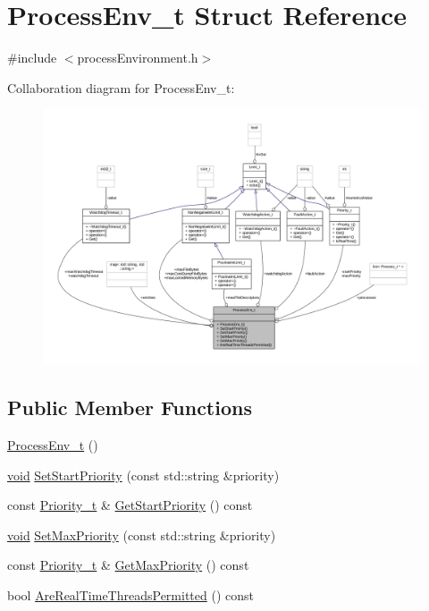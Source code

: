 \hypertarget{struct_process_env__t}{}\section{Process\+Env\+\_\+t Struct Reference}
\label{struct_process_env__t}


{\ttfamily \#include $<$process\+Environment.\+h$>$}



Collaboration diagram for Process\+Env\+\_\+t\+:
\nopagebreak
\begin{figure}[H]
\begin{center}
\leavevmode
\includegraphics[width=350pt]{struct_process_env__t__coll__graph}
\end{center}
\end{figure}
\subsection*{Public Member Functions}
\begin{DoxyCompactItemize}
\item 
\hyperlink{struct_process_env__t_a63030b2769539fb822846acebf274631}{Process\+Env\+\_\+t} ()
\item 
\hyperlink{_t_e_m_p_l_a_t_e__cdef_8h_ac9c84fa68bbad002983e35ce3663c686}{void} \hyperlink{struct_process_env__t_a74c5bd96874150114430a952fd0296e4}{Set\+Start\+Priority} (const std\+::string \&priority)
\item 
const \hyperlink{class_priority__t}{Priority\+\_\+t} \& \hyperlink{struct_process_env__t_a6e3bb17fa4f6c34555a8c9f576018b5d}{Get\+Start\+Priority} () const 
\item 
\hyperlink{_t_e_m_p_l_a_t_e__cdef_8h_ac9c84fa68bbad002983e35ce3663c686}{void} \hyperlink{struct_process_env__t_acd47de84d4682e99050f20aba1e33f83}{Set\+Max\+Priority} (const std\+::string \&priority)
\item 
const \hyperlink{class_priority__t}{Priority\+\_\+t} \& \hyperlink{struct_process_env__t_ad393c03980cc79aac7c59d20bf847a9f}{Get\+Max\+Priority} () const 
\item 
bool \hyperlink{struct_process_env__t_a1ffccd2ba6e7a223f5c9e02c5d590703}{Are\+Real\+Time\+Threads\+Permitted} () const 
\end{DoxyCompactItemize}
